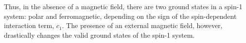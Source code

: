 Thus, in the absence of a magnetic field, there are two ground states in a
spin-1 system: polar and ferromagnetic, depending on the sign of the
spin-dependent interaction term, \(c_1\).
The presence of an external magnetic field, however, drastically changes the
valid ground states of the spin-1 system.
\begin{figure}[htb]
    \centering
\end{figure}
